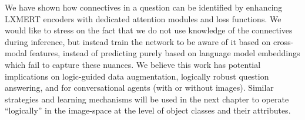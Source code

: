 We have shown how connectives in a question can be identified by enhancing LXMERT encoders with dedicated attention modules and loss functions.
We would like to stress on the fact that we do not use knowledge of the connectives during inference, but instead train the network to be aware of it based on cross-modal features, instead of predicting purely based on language model embeddings which fail to capture these nuances.
We believe this work has potential implications on logic-guided data augmentation, logically robust question answering, and for conversational agents (with or without images).
Similar strategies and learning mechanisms will be used in the next chapter to operate ``logically'' in the image-space at the level of object classes and their attributes.



